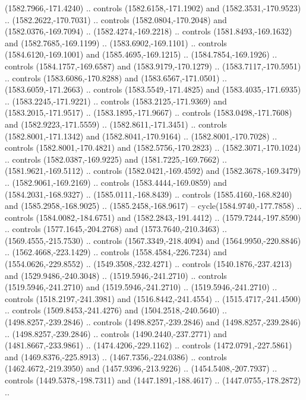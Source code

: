 \begin{scope}[shift={(-22.88722,-49.76189)}]
\begin{scope}[shift={(-739.46591,328.36782)}]
      (1582.7966,-171.4240) .. controls (1582.6158,-171.1902) and
      (1582.3531,-170.9523) .. (1582.2622,-170.7031) .. controls
      (1582.0804,-170.2048) and (1582.0376,-169.7094) .. (1582.4274,-169.2218) ..
      controls (1581.8493,-169.1632) and (1582.7685,-169.1199) ..
      (1583.6902,-169.1101) .. controls (1584.6120,-169.1001) and
      (1585.4695,-169.1215) .. (1584.7854,-169.1926) .. controls
      (1584.1757,-169.6587) and (1583.9179,-170.1279) .. (1583.7117,-170.5951) ..
      controls (1583.6086,-170.8288) and (1583.6567,-171.0501) ..
      (1583.6059,-171.2663) .. controls (1583.5549,-171.4825) and
      (1583.4035,-171.6935) .. (1583.2245,-171.9221) .. controls
      (1583.2125,-171.9369) and (1583.2015,-171.9517) .. (1583.1895,-171.9667) ..
      controls (1583.0498,-171.7608) and (1582.9223,-171.5559) ..
      (1582.8611,-171.3451) .. controls (1582.8001,-171.1342) and
      (1582.8041,-170.9164) .. (1582.8001,-170.7028) .. controls
      (1582.8001,-170.4821) and (1582.5756,-170.2823) .. (1582.3071,-170.1024) ..
      controls (1582.0387,-169.9225) and (1581.7225,-169.7662) ..
      (1581.9621,-169.5112) .. controls (1582.0421,-169.4592) and
      (1582.3678,-169.3479) .. (1582.9061,-169.2169) .. controls
      (1583.4444,-169.0859) and (1584.2031,-168.9327) .. (1585.0111,-168.8439) ..
      controls (1585.4160,-168.8240) and (1585.2958,-168.9025) ..
      (1585.2458,-168.9617) -- cycle(1584.9740,-177.7858) .. controls
      (1584.0082,-184.6751) and (1582.2843,-191.4412) .. (1579.7244,-197.8590) ..
      controls (1577.1645,-204.2768) and (1573.7640,-210.3463) ..
      (1569.4555,-215.7530) .. controls (1567.3349,-218.4094) and
      (1564.9950,-220.8846) .. (1562.4668,-223.1429) .. controls
      (1558.4584,-226.7234) and (1554.0626,-229.8552) .. (1549.3508,-232.4271) ..
      controls (1540.1876,-237.4213) and (1529.9486,-240.3048) ..
      (1519.5946,-241.2710) .. controls (1519.5946,-241.2710) and
      (1519.5946,-241.2710) .. (1519.5946,-241.2710) .. controls
      (1518.2197,-241.3981) and (1516.8442,-241.4554) .. (1515.4717,-241.4500) ..
      controls (1509.8453,-241.4276) and (1504.2518,-240.5640) ..
      (1498.8257,-239.2846) .. controls (1498.8257,-239.2846) and
      (1498.8257,-239.2846) .. (1498.8257,-239.2846) .. controls
      (1490.2440,-237.2771) and (1481.8667,-233.9861) .. (1474.4206,-229.1162) ..
      controls (1472.0791,-227.5861) and (1469.8376,-225.8913) ..
      (1467.7356,-224.0386) .. controls (1462.4672,-219.3950) and
      (1457.9396,-213.9226) .. (1454.5408,-207.7937) .. controls
      (1449.5378,-198.7311) and (1447.1891,-188.4617) .. (1447.0755,-178.2872) ..

\end{scope}
\end{scope}

